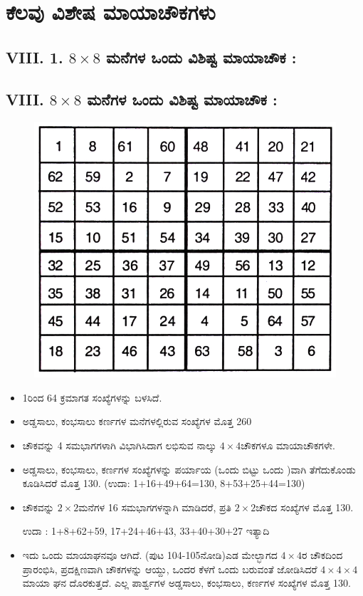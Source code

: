 \chapter{ಕೆಲವು ವಿಶೇಷ ಮಾಯಾಚೌಕಗಳು}

\section*{VIII. 1. $8 \times 8$ ಮನೆಗಳ ಒಂದು ವಿಶಿಷ್ಟ ಮಾಯಾಚೌಕ :}

\section*{VIII. $8 \times 8$ ಮನೆಗಳ ಒಂದು ವಿಶಿಷ್ಟ ಮಾಯಾಚೌಕ :}
\begin{figure}[H]
\includegraphics{src/figures/chap7/fig7-1.jpg}
\end{figure}

\begin{itemize}
	\item 1ರಿಂದ 64 ಕ್ರಮಾಗತ ಸಂಖ್ಯೆಗಳನ್ನು ಬಳಸಿದೆ.
	\item ಅಡ್ಡಸಾಲು, ಕಂಭಸಾಲು ಕರ್ಣಗಳ ಮನೆಗಳಲ್ಲಿರುವ ಸಂಖ್ಯೆಗಳ ಮೊತ್ತ 260
	\item ಚೌಕವನ್ನು 4 ಸಮಭಾಗಗಳಾಗಿ ವಿಭಾಗಿಸಿದಾಗ ಲಭಿಸುವ ನಾಲ್ಕು $4 \times 4$ಚೌಕಗಳೂ ಮಾಯಾಚೌಕಗಳೇ.
	\item ಅಡ್ಡಸಾಲು, ಕಂಭಸಾಲು, ಕರ್ಣಗಳ ಸಂಖ್ಯೆಗಳನ್ನು ಪರ್ಯಾಯ (ಒಂದು ಬಿಟ್ಟು ಒಂದು )ವಾಗಿ ತೆಗೆದುಕೊಂಡು ಕೂಡಿಸಿದರೆ ಮೊತ್ತ 130. (ಉದಾ: 1+16+49+64=130, 8+53+25+44=130)
	\item ಚೌಕವನ್ನು $2 \times 2$ಮನೆಗಳ 16 ಸಮಭಾಗಗಳನ್ನಾಗಿ ಮಾಡಿದರೆ, ಪ್ರತಿ $2 \times 2$ಚೌಕದ ಸಂಖ್ಯೆಗಳ ಮೊತ್ತ 130.

	ಉದಾ : 1+8+62+59, 17+24+46+43, 33+40+30+27 ಇತ್ಯಾದಿ
	\item ಇದು ಒಂದು ಮಾಯಾಘನವೂ ಆಗಿದೆ. (ಪುಟ 104-105ನೋಡಿ)ಎಡ ಮೇಲ್ಭಾಗದ $4 \times 4$ರ ಚೌಕದಿಂದ ಪ್ರಾರಂಭಿಸಿ, ಪ್ರದಕ್ಷಿಣವಾಗಿ ಚೌಕಗಳನ್ನು ಆಯ್ದು, ಒಂದರ ಕೆಳಗೆ ಒಂದು ಬರುವಂತೆ ಜೋಡಿಸಿದರೆ $4 \times 4 \times 4$ ಮಾಯಾ ಘನ ದೊರಕುತ್ತದೆ. ಎಲ್ಲ ಪಾರ್ಶ್ವಗಳ ಅಡ್ಡಸಾಲು, ಕಂಭಸಾಲು, ಕರ್ಣಗಳ ಸಂಖ್ಯೆಗಳ ಮೊತ್ತ 130.
\end{itemize}

